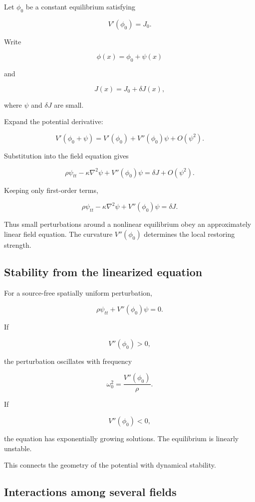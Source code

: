Let \(\phi_{0}\) be a constant equilibrium satisfying

\[
V'(\phi_{0})=J_{0}.
\]

Write

\[
\phi(x)=\phi_{0}+\psi(x)
\]

and

\[
J(x)=J_{0}+\delta J(x),
\]

where \(\psi\) and \(\delta J\) are small.

Expand the potential derivative:

\[
V'(\phi_{0}+\psi)
=
V'(\phi_{0})
+
V''(\phi_{0})\psi
+
O(\psi^{2}).
\]

Substitution into the field equation gives

\[
\rho\psi_{tt}
-
\kappa\nabla^{2}\psi
+
V''(\phi_{0})\psi
=
\delta J
+
O(\psi^{2}).
\]

Keeping only first-order terms,

\[
\boxed{
\rho\psi_{tt}
-
\kappa\nabla^{2}\psi
+
V''(\phi_{0})\psi
=
\delta J
}.
\]

Thus small perturbations around a nonlinear equilibrium obey an approximately linear field equation. The curvature \(V''(\phi_{0})\) determines the local restoring strength.

\subsection{Stability from the linearized equation}

For a source-free spatially uniform perturbation,

\[
\rho\psi_{tt}
+
V''(\phi_{0})\psi
=0.
\]

If

\[
V''(\phi_{0})>0,
\]

the perturbation oscillates with frequency

\[
\omega_{0}^{2}
=
\frac{V''(\phi_{0})}{\rho}.
\]

If

\[
V''(\phi_{0})<0,
\]

the equation has exponentially growing solutions. The equilibrium is linearly unstable.

This connects the geometry of the potential with dynamical stability.

\subsection{Interactions among several fields}

